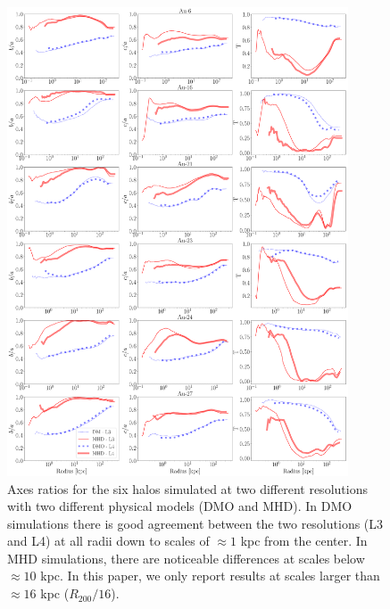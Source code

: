 \documentclass[usenatbib]{mnras}
\begin{document}
\begin{figure}
\includegraphics[width=0.9\textwidth]{shape_resolution.pdf}
\caption{Axes ratios for the six halos simulated at two different
  resolutions with two different physical models (DMO and MHD). 
  In DMO simulations there is good agreement between the two
  resolutions (L3 and L4) at all radii down to scales of $\approx 1$
  kpc from the center. 
  In MHD simulations, there are noticeable differences at scales below
  $\approx 10$ kpc. 
  In this paper, we only report results at scales larger than $\approx 16$ kpc
  ($R_{200}/16$).}
\label{fig:resolution}
\end{figure}
\end{document}
